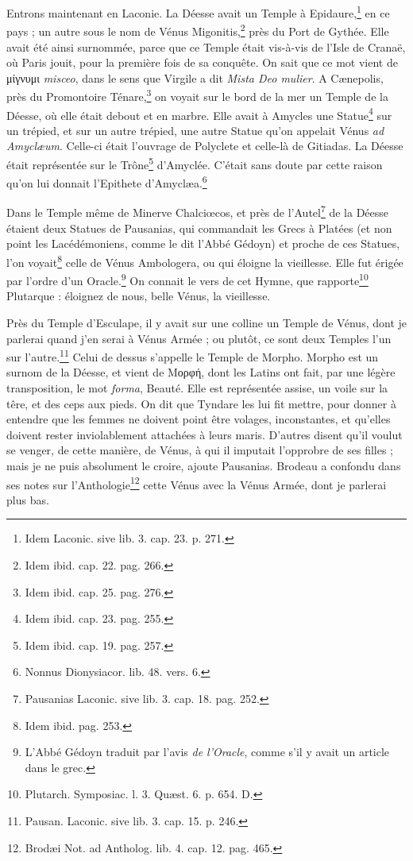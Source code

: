 \documentclass[a4paper, 11pt, oneside, polutonikogreek, french]{article}
\begin{document}
Entrons maintenant en Laconie. La Déesse avait un Temple à Epidaure,\footnote{Idem Laconic. sive lib. 3. cap. 23. p. 271.} en ce pays ; un autre sous le nom de Vénus Migonitis,\footnote{Idem ibid. cap. 22. pag. 266.} près du Port de Gythée. Elle avait été ainsi surnommée, parce que ce Temple était vis-à-vis de l'Isle de Cranaë, où Paris jouit, pour la première fois de sa conquête. On sait que ce mot vient de μίγνυμι \emph{misceo}, dans le sens que Virgile a dit \emph{Mista Deo mulier}. A Cænepolis, près du Promontoire Ténare,\footnote{Idem ibid. cap. 25. pag. 276.} on voyait sur le bord de la mer un Temple de la Déesse, où elle était debout et en marbre. Elle avait à Amycles une Statue\footnote{Idem ibid. cap. 23. pag. 255.} sur un trépied, et sur un autre trépied, une autre Statue qu'on appelait Vénus \emph{ad Amyclæum}. Celle-ci était l'ouvrage de Polyclete et celle-là de Gitiadas. La Déesse était représentée sur le Trône\footnote{Idem ibid. cap. 19. pag. 257.} d'Amyclée. C'était sans doute par cette raison qu'on lui donnait l'Epithete d'Amyclæa.\footnote{Nonnus Dionysiacor. lib. 48. vers. 6.}

Dans le Temple même de Minerve Chalciœcos, et près de l'Autel\footnote{Pausanias Laconic. sive lib. 3. cap. 18. pag. 252.} de la Déesse étaient deux Statues de Pausanias, qui commandait les Grecs à Platées (et non point les Lacédémoniens, comme le dit l'Abbé Gédoyn) et proche de ces Statues, l'on voyait\footnote{Idem ibid. pag. 253.} celle de Vénus Ambologera, ou qui éloigne la vieillesse. Elle fut érigée par l'ordre d'un Oracle.\footnote{L'Abbé Gédoyn traduit par l'avis \emph{de l'Oracle}, comme s'il y avait un article dans le grec.} On connait le vers de cet Hymne, que rapporte\footnote{Plutarch. Symposiac. l. 3. Quæst. 6. p. 654. D.} Plutarque : éloignez de nous, belle Vénus, la vieillesse.

Près du Temple d'Esculape, il y avait sur une colline un Temple de Vénus, dont je parlerai quand j'en serai à Vénus Armée ; ou plutôt, ce sont deux Temples l'un sur l'autre.\footnote{Pausan. Laconic. sive lib. 3. cap. 15. p. 246.} Celui de dessus s'appelle le Temple de Morpho. Morpho est un surnom de la Déesse, et vient de Μορφή, dont les Latins ont fait, par une légère transposition, le mot \emph{forma}, Beauté. Elle est représentée assise, un voile sur la têre, et des ceps aux pieds. On dit que Tyndare les lui fit mettre, pour donner à entendre que les femmes ne doivent point être volages, inconstantes, et qu'elles doivent rester inviolablement attachées à leurs maris. D'autres disent qu'il voulut se venger, de cette manière, de Vénus, à qui il imputait l'opprobre de ses filles ; mais je ne puis absolument le croire, ajoute Pausanias. Brodeau a confondu dans ses notes sur l'Anthologie\footnote{Brodæi Not. ad Antholog. lib. 4. cap. 12. pag. 465.} cette Vénus avec la Vénus Armée, dont je parlerai plus bas.
\end{document}
